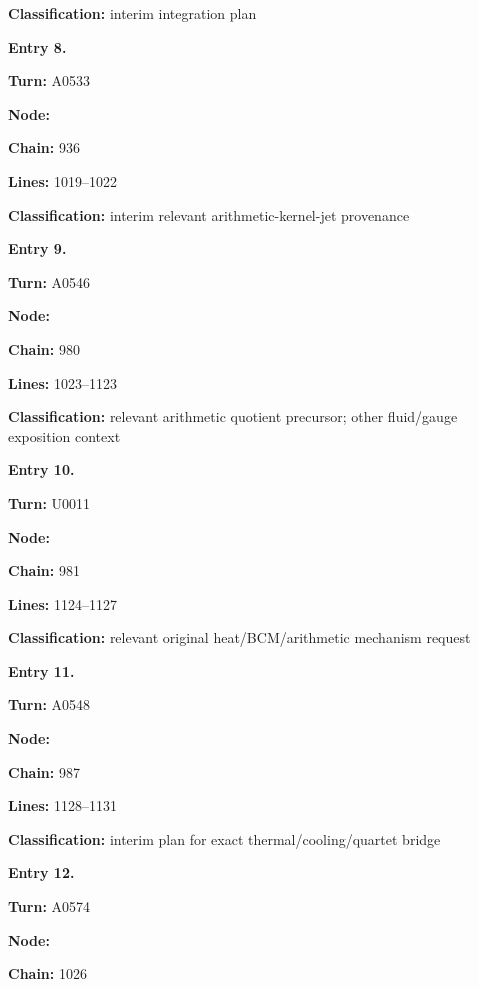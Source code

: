 \documentclass[10pt,a4paper,oneside]{report}
\begin{document}
\textbf{Classification:} interim integration plan


\textbf{Entry 8.}

\textbf{Turn:} A0533

\textbf{Node:} \protect{}

\textbf{Chain:} 936

\textbf{Lines:} 1019--1022

\textbf{Classification:} interim relevant arithmetic-kernel-jet
provenance


\textbf{Entry 9.}

\textbf{Turn:} A0546

\textbf{Node:} \protect{}

\textbf{Chain:} 980

\textbf{Lines:} 1023--1123

\textbf{Classification:} relevant arithmetic quotient precursor; other
fluid/gauge exposition context


\textbf{Entry 10.}

\textbf{Turn:} U0011

\textbf{Node:} \protect{}

\textbf{Chain:} 981

\textbf{Lines:} 1124--1127

\textbf{Classification:} relevant original heat/BCM/arithmetic mechanism
request


\textbf{Entry 11.}

\textbf{Turn:} A0548

\textbf{Node:} \protect{}

\textbf{Chain:} 987

\textbf{Lines:} 1128--1131

\textbf{Classification:} interim plan for exact thermal/cooling/quartet
bridge


\textbf{Entry 12.}

\textbf{Turn:} A0574

\textbf{Node:} \protect{}

\textbf{Chain:} 1026
\end{document}
